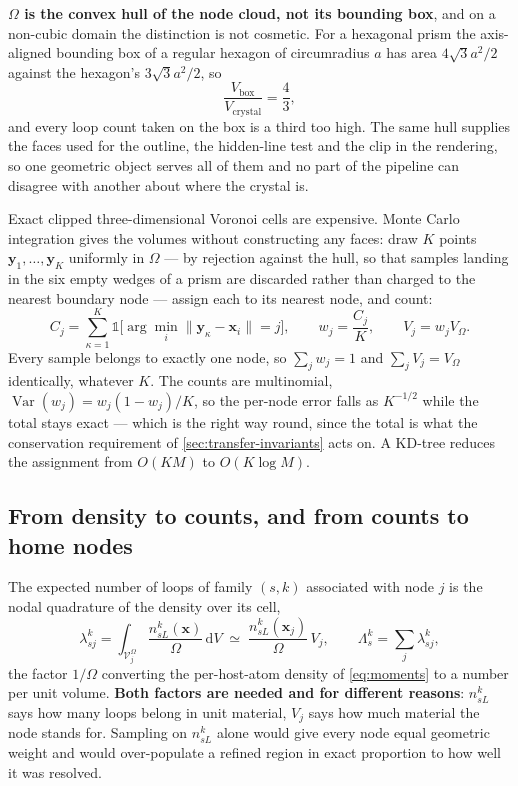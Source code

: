 \documentclass{article}
\begin{document}
\textbf{$\Omega$ is the convex hull of the node cloud, not its bounding box},
and on a non-cubic domain the distinction is not cosmetic. For a hexagonal
prism the axis-aligned bounding box of a regular hexagon of
circumradius $a$ has area $4\sqrt3a^2/2$ against the hexagon's
$3\sqrt3a^2/2$, so
\begin{equation}
  \frac{V_{\mathrm{box}}}{V_{\mathrm{crystal}}}=\frac43 ,
  \label{eq:boxratio}
\end{equation}
and every loop count taken on the box is a third too high. The same hull supplies
the faces used for the outline, the hidden-line test and the clip in the
rendering, so one geometric object serves all of them and no part of the
pipeline can disagree with another about where the crystal is.

Exact clipped three-dimensional Voronoi cells are expensive. Monte Carlo
integration gives the volumes without constructing any faces: draw $K$ points
$\bm y_1,\dots,\bm y_K$ uniformly in $\Omega$ --- by rejection against the hull,
so that samples landing in the six empty wedges of a prism are discarded rather
than charged to the nearest boundary node --- assign each to its nearest node,
and count:
\begin{equation}
  C_j=\sum_{\kappa=1}^{K}\mathbb 1\bigl[\arg\min_i\|\bm y_\kappa-\bm x_i\|=j\bigr],
  \qquad
  w_j=\frac{C_j}{K},
  \qquad
  V_j=w_jV_\Omega .
  \label{eq:mcvolumes}
\end{equation}
Every sample belongs to exactly one node, so $\sum_jw_j=1$ and
$\sum_jV_j=V_\Omega$ identically, whatever $K$. The counts are multinomial,
$\operatorname{Var}(w_j)=w_j(1-w_j)/K$, so the per-node error falls as
$K^{-1/2}$ while the total stays exact --- which is the right way round, since
the total is what the conservation requirement of
\cref{sec:transfer-invariants} acts on. A KD-tree reduces the assignment from
$O(KM)$ to $O(K\log M)$.

\subsection{From density to counts, and from counts to home nodes}
\label{sec:counts}

The expected number of loops of family $(s,k)$ associated with node $j$ is the
nodal quadrature of the density over its cell,
\begin{equation}
  \lambda^k_{sj}=\int_{\mathcal V^\Omega_j}\frac{n^k_{sL}(\bm x)}{\Omega}\,\mathrm dV
  \;\simeq\;\frac{n^k_{sL}(\bm x_j)}{\Omega}\,V_j,
  \qquad
  \Lambda^k_s=\sum_j\lambda^k_{sj},
  \label{eq:lambda}
\end{equation}
the factor $1/\Omega$ converting the per-host-atom density of \cref{eq:moments}
to a number per unit volume. \textbf{Both factors are needed and for different
reasons}: $n^k_{sL}$ says how many loops belong in unit material, $V_j$ says how
much material the node stands for. Sampling on $n^k_{sL}$ alone would give every
node equal geometric weight and would over-populate a refined region in exact
proportion to how well it was resolved.
\end{document}
